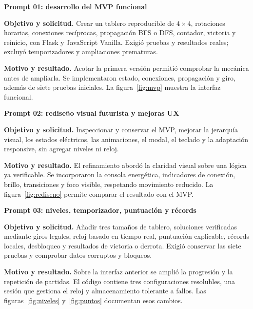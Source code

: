 \documentclass[12pt,letterpaper]{article}
\begin{document}
\textbf{Prompt 01: desarrollo del MVP funcional}\par
\textbf{Objetivo y solicitud.} Crear un tablero reproducible de $4\times4$, rotaciones horarias, conexiones recíprocas, propagación BFS o DFS, contador, victoria y reinicio, con Flask y JavaScript Vanilla. Exigió pruebas y resultados reales; excluyó temporizadores y ampliaciones prematuras.

\textbf{Motivo y resultado.} Acotar la primera versión permitió comprobar la mecánica antes de ampliarla. Se implementaron estado, conexiones, propagación y giro, además de siete pruebas iniciales. La figura~\ref{fig:mvp} muestra la interfaz funcional.

\textbf{Prompt 02: rediseño visual futurista y mejoras UX}\par
\textbf{Objetivo y solicitud.} Inspeccionar y conservar el MVP, mejorar la jerarquía visual, los estados eléctricos, las animaciones, el modal, el teclado y la adaptación responsive, sin agregar niveles ni reloj.

\textbf{Motivo y resultado.} El refinamiento abordó la claridad visual sobre una lógica ya verificable. Se incorporaron la consola energética, indicadores de conexión, brillo, transiciones y foco visible, respetando movimiento reducido. La figura~\ref{fig:rediseno} permite comparar el resultado con el MVP.

\textbf{Prompt 03: niveles, temporizador, puntuación y récords}\par
\textbf{Objetivo y solicitud.} Añadir tres tamaños de tablero, soluciones verificadas mediante giros legales, reloj basado en tiempo real, puntuación explicable, récords locales, desbloqueo y resultados de victoria o derrota. Exigió conservar las siete pruebas y comprobar datos corruptos y bloqueos.

\textbf{Motivo y resultado.} Sobre la interfaz anterior se amplió la progresión y la repetición de partidas. El código contiene tres configuraciones resolubles, una sesión que gestiona el reloj y almacenamiento tolerante a fallos. Las figuras~\ref{fig:niveles} y~\ref{fig:puntos} documentan esos cambios.

\clearpage
\end{document}
